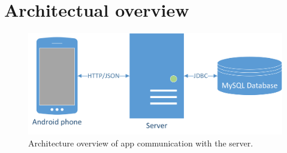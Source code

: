 \newpage
\section{Architectual overview}

\begin{figure}[H]
\includegraphics[width=\textwidth]{ch/architecture/fig/arch.png}
\caption{Architecture overview of app communication with the server.}
\label{fig:architecture}
\end{figure}

